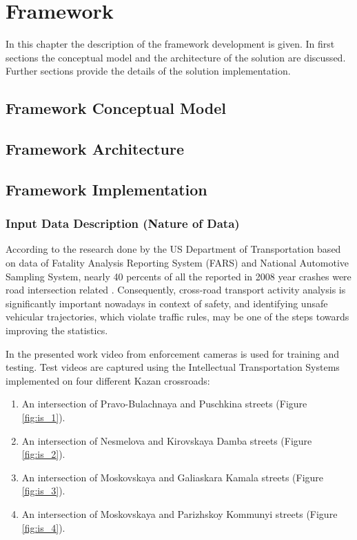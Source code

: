 \chapter{Framework}
\label{ch:Framework}

In this chapter the description of the framework development is given. In first sections the conceptual model and the architecture of the solution are discussed. Further sections provide the details of the solution implementation.

\section{Framework Conceptual Model}

\section{Framework Architecture}

\section{Framework Implementation}

\subsection{Input Data Description (Nature of Data)}

According to the research done by the US Department of Transportation based on data of Fatality Analysis Reporting System (FARS) and National Automotive Sampling System, nearly 40 percents of all the reported in 2008 year crashes were road intersection related \cite{inproceedings:10_cfi}. Consequently, cross-road transport activity analysis is significantly important nowadays in context of safety, and identifying unsafe vehicular trajectories, which violate traffic rules, may be one of the steps towards improving the statistics.

In the presented work video from enforcement cameras is used for training and testing. Test videos are captured using the Intellectual Transportation Systems implemented on four different Kazan crossroads:
\begin{enumerate}
	\item An intersection of Pravo-Bulachnaya and Puschkina streets (Figure \ref{fig:is_1}).
	\item An intersection of Nesmelova and Kirovskaya Damba streets (Figure \ref{fig:is_2}).
	\item An intersection of Moskovskaya and Galiaskara Kamala streets (Figure \ref{fig:is_3}).
	\item An intersection of Moskovskaya and Parizhskoy Kommunyi streets (Figure \ref{fig:is_4}).
\end{enumerate}

